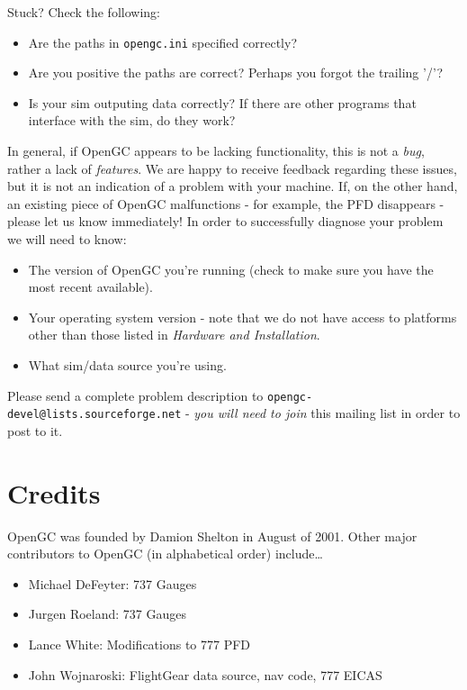 \documentclass[11pt]{article}
\begin{document}
Stuck? Check the following:

\begin{itemize}
\item Are the paths in \texttt{opengc.ini} specified correctly?
\item Are you positive the paths are correct? Perhaps you forgot the trailing '/'?
\item Is your sim outputing data correctly? If there are other programs that interface with the sim, do they work?
\end{itemize}

In general, if OpenGC appears to be lacking functionality, this is not a \emph{bug}, rather a lack of \emph{features}. We are happy to receive feedback regarding these issues, but it is not an indication of a problem with your machine. If, on the other hand, an existing piece of OpenGC malfunctions - for example, the PFD disappears - please let us know immediately! In order to successfully diagnose your problem we will need to know:

\begin{itemize}
\item The version of OpenGC you're running (check to make sure you have the most recent available).
\item Your operating system version - note that we do not have access to platforms other than those listed in \emph{Hardware and Installation}.
\item What sim/data source you're using.
\end{itemize}

\noindent Please send a complete problem description to \texttt{opengc-devel@lists.sourceforge.net} - \emph{you will need to join} this mailing list in order to post to it.

\section{Credits}
OpenGC was founded by Damion Shelton in August of 2001. Other major contributors to OpenGC (in alphabetical order) include\dots

\begin{itemize}
\item Michael DeFeyter: 737 Gauges
\item Jurgen Roeland: 737 Gauges
\item Lance White: Modifications to 777 PFD
\item John Wojnaroski: FlightGear data source, nav code, 777 EICAS
\end{itemize}
\end{document}

